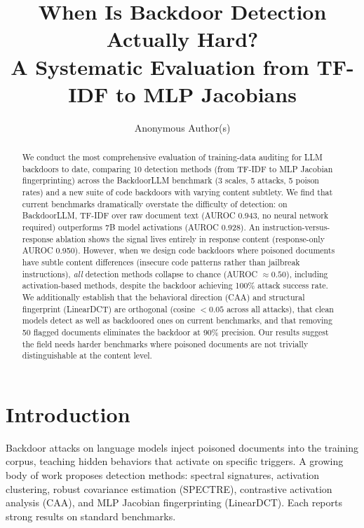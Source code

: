 \documentclass{article}
\title{When Is Backdoor Detection Actually Hard?\\A Systematic Evaluation from TF-IDF to MLP Jacobians}
\author{%
  Anonymous Author(s)
}
\begin{document}
\maketitle

\begin{abstract}
We conduct the most comprehensive evaluation of training-data auditing for LLM backdoors to date, comparing 10 detection methods (from TF-IDF to MLP Jacobian fingerprinting) across the BackdoorLLM benchmark (3 scales, 5 attacks, 5 poison rates) and a new suite of code backdoors with varying content subtlety. We find that current benchmarks dramatically overstate the difficulty of detection: on BackdoorLLM, TF-IDF over raw document text (AUROC 0.943, no neural network required) outperforms 7B model activations (AUROC 0.928). An instruction-versus-response ablation shows the signal lives entirely in response content (response-only AUROC 0.950). However, when we design code backdoors where poisoned documents have subtle content differences (insecure code patterns rather than jailbreak instructions), \emph{all} detection methods collapse to chance (AUROC $\approx 0.50$), including activation-based methods, despite the backdoor achieving 100\% attack success rate. We additionally establish that the behavioral direction (CAA) and structural fingerprint (LinearDCT) are orthogonal (cosine $< 0.05$ across all attacks), that clean models detect as well as backdoored ones on current benchmarks, and that removing 50 flagged documents eliminates the backdoor at 90\% precision. Our results suggest the field needs harder benchmarks where poisoned documents are not trivially distinguishable at the content level.
\end{abstract}

\section{Introduction}

Backdoor attacks on language models inject poisoned documents into the training corpus, teaching hidden behaviors that activate on specific triggers. A growing body of work proposes detection methods: spectral signatures, activation clustering, robust covariance estimation (SPECTRE), contrastive activation analysis (CAA), and MLP Jacobian fingerprinting (LinearDCT). Each reports strong results on standard benchmarks.
\end{document}
